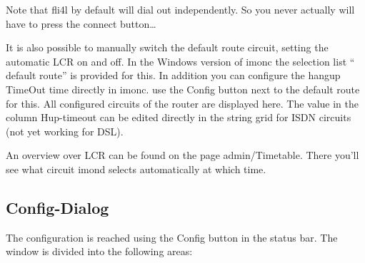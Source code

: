   \medskip

  \noindent Note that fli4l by default will dial out independently. So you never
  actually will have to press the connect button\ldots

  It is also possible to manually switch the default route circuit, setting
  the automatic LCR on and off. In the Windows version of imonc the selection
  list `` default route'' is provided for this. In addition you can configure the
  hangup TimeOut time directly in imonc. use the Config button next to the default
  route for this. All configured circuits of the router are displayed here. The
  value in the column Hup-timeout can be edited directly in the string grid
  for ISDN circuits (not yet working for DSL).

  An overview over LCR can be found on the page admin/Timetable.
  There you'll see what circuit imond selects automatically at which time.

  \subsection{Config-Dialog}

  The configuration is reached using the Config button in the status bar. The window
  is divided into the following areas:

